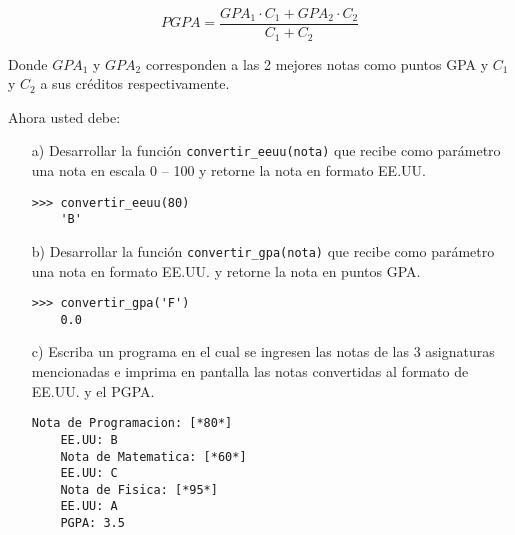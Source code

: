  \begin{equation*}
    PGPA = \frac{GPA_1 \cdot C_1 + GPA_2 \cdot C_2}{C_1 + C_2}
  \end{equation*}
  
  Donde \(GPA_1\) y \(GPA_2\) corresponden a las 2 mejores notas como puntos GPA
  y \(C_1\) y \(C_2\) a sus créditos respectivamente.
    
  \pagebreak[4]
  
  Ahora usted debe:
  
  \begin{itemize}
  \item[a)]
    Desarrollar la función \texttt{convertir\_eeuu(nota)}
    que recibe como parámetro una nota en escala 0 -- 100 y retorne la nota
    en formato EE.UU.
    
    \begin{lstlisting}[style=consola]
    >>> convertir_eeuu(80)
    'B'
    \end{lstlisting}
  \item[b)]
    Desarrollar la función \texttt{convertir\_gpa(nota)}
    que recibe como parámetro una nota en formato EE.UU.
    y retorne la nota en puntos GPA.
    
    \begin{lstlisting}[style=consola]
    >>> convertir_gpa('F')
    0.0
    \end{lstlisting}
  \item[c)]
    Escriba un programa en el cual se ingresen las notas
    de las 3 asignaturas mencionadas e imprima en pantalla
    las notas convertidas al formato de EE.UU.
    y el PGPA.
    
    \begin{lstlisting}[style=consola]
    Nota de Programacion: [*80*]
    EE.UU: B
    Nota de Matematica: [*60*]
    EE.UU: C
    Nota de Fisica: [*95*]
    EE.UU: A
    PGPA: 3.5
    \end{lstlisting}
  \end{itemize}